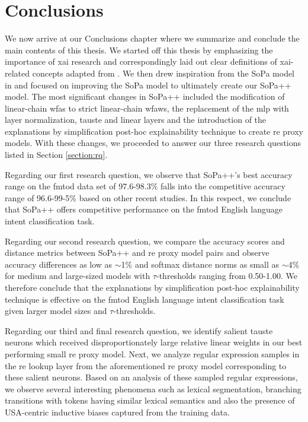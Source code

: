 \chapter{Conclusions}

\label{chapter:conclusions}

We now arrive at our Conclusions chapter where we summarize and conclude the
main contents of this thesis. We started off this thesis by emphasizing the
importance of \ac{xai} research and correspondingly laid out clear definitions of
\ac{xai}-related concepts adapted from \citet{arrieta2020explainable}. We then drew
inspiration from the SoPa model in \citet{schwartz2018sopa} and focused on
improving the SoPa model to ultimately create our SoPa++ model. The most
significant changes in SoPa++ included the modification of linear-chain \ac{wfas} to
strict linear-chain \ac{wfaws}, the replacement of the \ac{mlp} with layer
normalization, \ac{tauste} and linear layers and the introduction of the explanations
by simplification post-hoc explainability technique to create \ac{re} proxy models.
With these changes, we proceeded to answer our three research questions listed
in Section \ref{section:rq}.

Regarding our first research question, we observe that SoPa++'s best accuracy
range on the \ac{fmtod} data set of 97.6-98.3$\%$ falls into the competitive accuracy
range of 96.6-99-5$\%$ based on other recent studies. In this respect, we
conclude that SoPa++ offers competitive performance on the \ac{fmtod} English
language intent classification task.

Regarding our second research question, we compare the accuracy scores and
distance metrics between SoPa++ and \ac{re} proxy model pairs and observe accuracy
differences as low as $\sim$1$\%$ and softmax distance norms as small as $\sim$4$\%$ for
medium and large-sized models with $\tau$-thresholds ranging from 0.50-1.00. We
therefore conclude that the explanations by simplification post-hoc
explainability technique is effective on the \ac{fmtod} English language intent
classification task given larger model sizes and $\tau$-thresholds.

Regarding our third and final research question, we identify salient \ac{tauste}
neurons which received disproportionately large relative linear weights in our
best performing small \ac{re} proxy model. Next, we analyze regular expression
samples in the \ac{re} lookup layer from the aforementioned \ac{re} proxy model
corresponding to these salient neurons. Based on an analysis of these sampled
regular expressions, we observe several interesting phenomena such as lexical
segmentation, branching transitions with tokens having similar lexical semantics
and also the presence of USA-centric inductive biases captured from the training
data.


